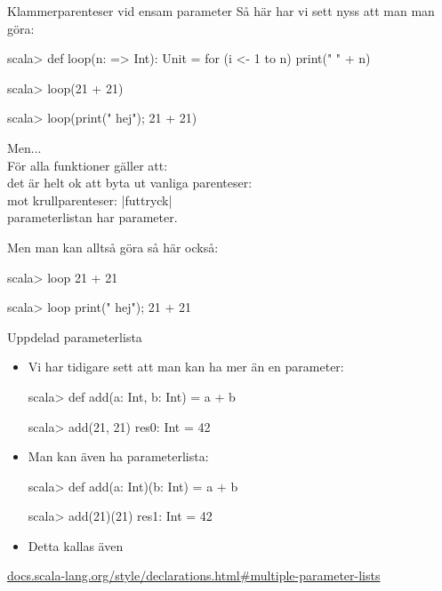 \begin{Slide}{Klammerparenteser vid ensam parameter}
Så här har vi sett nyss att man man göra:
\begin{REPL}
scala> def loop(n: => Int): Unit = for (i <- 1 to n) print(" " + n)

scala> loop(21 + 21)

scala> loop({print(" hej"); 21 + 21})
\end{REPL}

Men...\\För alla funktioner  gäller att: \\ det är helt ok att byta ut vanliga parenteser: \hfill{} \\ mot krullparenteser: \hfill\code|f{uttryck}| \\  parameterlistan har  parameter.  

\vspace{0.5em}Men man kan alltså göra så här också:
\begin{REPLnonum}
scala> loop{ 21 + 21 }

scala> loop{ print(" hej"); 21 + 21 }
\end{REPLnonum}


\end{Slide} 

\begin{Slide}{Uppdelad parameterlista}
\begin{itemize}
\item Vi har tidigare sett att man kan ha mer än en parameter:
\begin{REPLnonum}
scala> def add(a: Int, b: Int) = a + b

scala> add(21, 21)
res0: Int = 42
\end{REPLnonum}

\item Man kan även ha  parameterlista:
\begin{REPLnonum}

scala> def add(a: Int)(b: Int) = a + b

scala> add(21)(21)
res1: Int = 42
\end{REPLnonum}
\item Detta kallas även  
\end{itemize}
\href{http://docs.scala-lang.org/style/declarations.html#multiple-parameter-lists}{\SlideFontTiny docs.scala-lang.org/style/declarations.html\#multiple-parameter-lists}
\end{Slide} 


